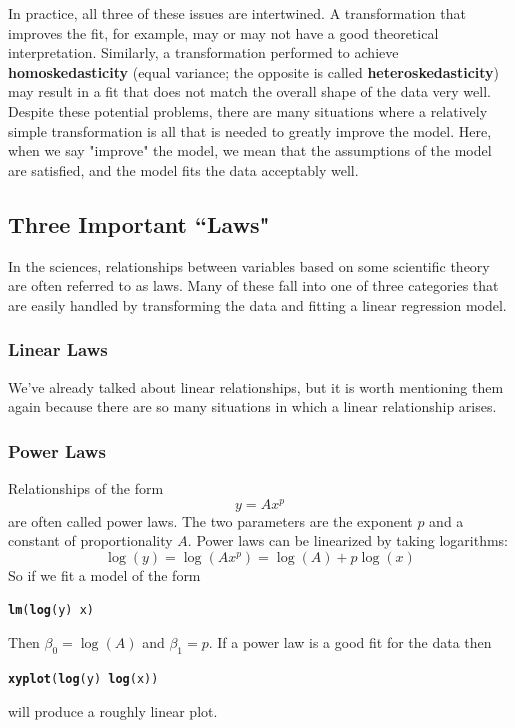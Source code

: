 \documentclass[twoside]{book}\usepackage[]{graphicx}\usepackage[]{xcolor}
\makeatletter
\newcommand{\hlopt}[1]{\textcolor[rgb]{0,0,0}{#1}}%
\newcommand{\hlstd}[1]{\textcolor[rgb]{0.345,0.345,0.345}{#1}}%
\newcommand{\hlkwd}[1]{\textcolor[rgb]{0.737,0.353,0.396}{\textbf{#1}}}%
\newenvironment{kframe}{%
 \def\at@end@of@kframe{}%
 \ifinner\ifhmode%
  \def\at@end@of@kframe{\end{minipage}}%
  \begin{minipage}{\columnwidth}%
 \fi\fi%
 \def\FrameCommand##1{\hskip\@totalleftmargin \hskip-\fboxsep
 \colorbox{shadecolor}{##1}\hskip-\fboxsep
     \hskip-\linewidth \hskip-\@totalleftmargin \hskip\columnwidth}%
 \MakeFramed {\advance\hsize-\width
   \@totalleftmargin\z@ \linewidth\hsize
   \@setminipage}}%
 {\par\unskip\endMakeFramed%
 \at@end@of@kframe}
\newenvironment{knitrout}{}{} %
\def\myindex#1{\index{#1}}
\def\term#1{\textbf{#1}}
\newcounter{example}[section]
\makeatother
\begin{document}
In practice, all three of these issues are intertwined.  A transformation that
improves the fit, for example, may or may not have a good theoretical 
interpretation.  
Similarly, a transformation performed to achieve \term{homoskedasticity} 
\myindex{heteroskedasticity}%
\myindex{homoskedasticity}%
(equal variance; the opposite is called \term{heteroskedasticity}) 
may result in a fit that does not match the overall shape of the data very well.
Despite these potential problems, there are many situations where a relatively
simple transformation is all that is needed to greatly improve the model.  Here, when we say "improve" the model, we mean that the assumptions of the model are satisfied, and the model fits the data acceptably well.

\subsection{Three Important ``Laws"}
In the sciences, relationships between variables based on some scientific theory
are often referred to as laws.  Many of these fall into one of three categories that
are easily handled by transforming the data and fitting a linear regression model.

\subsubsection{Linear Laws}
We've already talked about linear relationships, but it is worth mentioning them again because there
are so many situations in which a linear relationship arises.

\subsubsection{Power Laws}

Relationships of the form 
\[ y = A x^p \]
are often called power laws.  The two parameters are the exponent $p$ and a constant of proportionality $A$.
Power laws can be linearized by taking logarithms:
\[ \log(y) = \log(A x^p) = \log(A) + p \log(x) \]
So if we fit a model of the form
\begin{knitrout}
\color{fgcolor}\begin{kframe}
\begin{alltt}
\hlkwd{lm}\hlstd{(}\hlkwd{log}\hlstd{(y)} \hlopt{~} \hlstd{x)}
\end{alltt}
\end{kframe}
\end{knitrout}
Then $\beta_0 = \log(A)$ and $\beta_1 = p$.  
If a power law is a good fit for the data then
\begin{knitrout}
\color{fgcolor}\begin{kframe}
\begin{alltt}
\hlkwd{xyplot}\hlstd{(}\hlkwd{log}\hlstd{(y)} \hlopt{~} \hlkwd{log}\hlstd{(x))}
\end{alltt}
\end{kframe}
\end{knitrout}
will produce a roughly linear plot.
\end{document}
